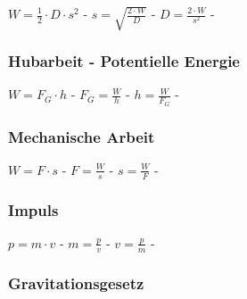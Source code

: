 $ W =\frac{1}{2}\cdot D\cdot s^{2} $ - $ s = \sqrt{\frac{2\cdot W}{ D}} $ - $ D =\frac{2\cdot W}{s^{2} } $ - \\ 
 
\subsubsection{Hubarbeit - Potentielle Energie} 
\begin{minipage}{0.45\textwidth} 
\end{minipage} 
\begin{minipage}{0.45\textwidth} 
 
\legende{}\end{minipage} 
 
$ W = F_{G} \cdot h $ - $ F_{G}  = \frac{W}{h} $ - $ h = \frac{W}{F_{G} } $ - \\ 
 
\subsubsection{Mechanische Arbeit} 
\begin{minipage}{0.45\textwidth} 
\end{minipage} 
\begin{minipage}{0.45\textwidth} 
 
\legende{}\end{minipage} 
 
$ W = F\cdot s $ - $ F = \frac{W}{s} $ - $ s = \frac{W}{F} $ - \\ 
 
\subsubsection{Impuls} 
\begin{minipage}{0.45\textwidth} 
\end{minipage} 
\begin{minipage}{0.45\textwidth} 
 
\legende{}\end{minipage} 
 
$ p = m\cdot v $ - $ m = \frac{p}{v} $ - $ v = \frac{p}{m} $ - \\ 
 
\subsubsection{Gravitationsgesetz} 
\begin{minipage}{0.45\textwidth} 
\end{minipage} 
\begin{minipage}{0.45\textwidth} 
 
\legende{}\end{minipage} 
 
